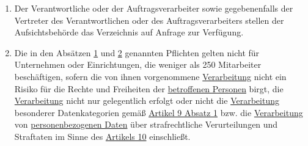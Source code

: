 \begin{enumerate}
  \item Der Verantwortliche oder der Auftragsverarbeiter sowie gegebenenfalls der Vertreter des Verantwortlichen oder
   des Auftragsverarbeiters stellen der Aufsichtsbehörde das Verzeichnis auf Anfrage zur Verfügung.
  \label{itm:30-4}

  \item Die in den Absätzen \hyperref[itm:30-1]{1} und \hyperref[itm:30-2]{2} genannten Pflichten gelten nicht für
   Unternehmen oder Einrichtungen, die weniger als 250 Mitarbeiter beschäftigen, sofern die von ihnen vorgenommene
   \hyperref[itm:04-2]{Verarbeitung} nicht ein Risiko für die Rechte und Freiheiten der \hyperref[itm:04-1]{betroffenen Personen} birgt, die \hyperref[itm:04-2]{Verarbeitung} nicht
   nur gelegentlich erfolgt oder nicht die \hyperref[itm:04-2]{Verarbeitung} besonderer Datenkategorien gemäß \hyperref[itm:09-1]{Artikel 9
   Absatz 1} bzw. die  \hyperref[itm:04-2]{Verarbeitung} von \hyperref[itm:04-1]{personenbezogenen Daten} über strafrechtliche Verurteilungen und Straftaten im
   Sinne des \hyperref[ch:10]{Artikels 10} einschließt.
  \label{itm:30-5}

\end{enumerate}


